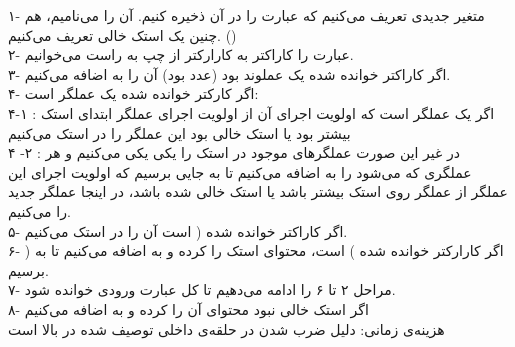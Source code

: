 \documentclass{article}
\begin{document}
\begin{enumerate}
\begin{enumerate}
		۱- متغیر جدیدی تعریف می‌کنیم که عبارت  را در آن ذخیره کنیم. آن را  می‌نامیم، هم چنین یک استک خالی تعریف می‌کنیم. ()\\
		۲- عبارت  را کاراکتر به کارارکتر از چپ به راست می‌خوانیم.\\
		۳- اگر کاراکتر خوانده شده یک عملوند بود (عدد بود) آن را به  اضافه می‌کنیم.\\
		۴- اگر کارکتر خوانده شده یک عملگر است:\\
			۴-۱ : اگر یک عملگر است که اولویت اجرای آن از اولویت اجرای عملگر ابتدای استک بیشتر بود یا استک خالی بود این عملگر را در استک  می‌کنیم\\
			۴ -۲ : در غیر این صورت عملگر‌های موجود در استک را یکی یکی  می‌کنیم و هر عملگری که  می‌شود را به  اضافه می‌کنیم تا به جایی برسیم که اولویت اجرای این عملگر از عملگر روی استک بیشتر باشد یا استک خالی شده باشد، در اینجا عملگر جدید را  می‌کنیم. \\
		۵- اگر کاراکتر خوانده شده ( است آن را در استک  می‌کنیم. \\
		۶- اگر کارارکتر خوانده شده ) است، محتوای استک را  کرده و به  اضافه می‌کنیم تا به ( برسیم. \\
		۷- مراحل ۲ تا ۶ را ادامه می‌دهیم تا کل عبارت ورودی خوانده شود. \\
		۸- اگر استک خالی نبود محتوای آن را  کرده و به  اضافه می‌کنیم\\
		هزینه‌ی زمانی:  دلیل ضرب شدن در  حلقه‌ی  داخلی توصیف شده در بالا است

         
         
 

\end{enumerate}
\end{enumerate}
\end{document}
